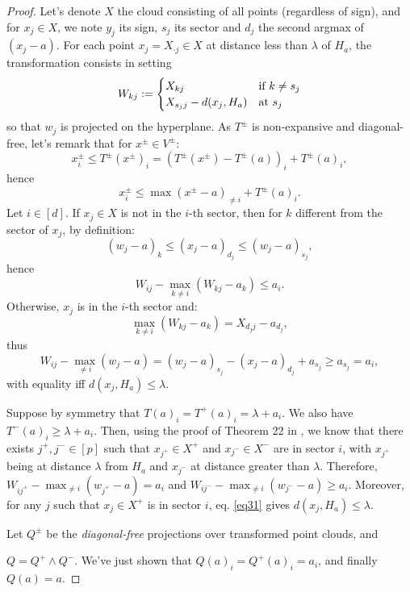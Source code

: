 \documentclass[oneside,english]{amsart}
\numberwithin{equation}{section}
\numberwithin{figure}{section}
\theoremstyle{plain}
\theoremstyle{definition}
\theoremstyle{plain}
\theoremstyle{remark}
\theoremstyle{plain}
\theoremstyle{definition}
\theoremstyle{definition}
\begin{document}
\begin{proof}
Let's denote $X$ the cloud consisting of all points (regardless of
sign), and for $x_{j}\in X$, we note $y_{j}$ its sign, $s_{j}$
its sector and $d_{j}$ the second argmax of $(x_{j}-a)$. For each
point $x_{j}=X_{\cdot j}\in X$ at distance less than $\lambda$ of
$H_{a}$, the transformation consists in setting
\[
W_{kj}:=\begin{cases}
X_{kj} & \text{if \ensuremath{k\ne s_{j}}}\\
X_{s_{j}j}-d(x_{j},H_{a}) & \text{at \ensuremath{s_{j}}}
\end{cases}
\]
so that $w_{j}$ is projected on the hyperplane. As $T^{\pm}$ is
non-expansive and diagonal-free, let's remark that for $x^{\pm}\in V^{\pm}$:
\[
x_{i}^{\pm}\le T^{\pm}(x^{\pm})_{i}=\left(T^{\pm}(x^{\pm})-T^{\pm}(a)\right)_{i}+T^{\pm}(a)_{i},
\]
hence 
\begin{equation}
x_{i}^{\pm}\le\max(x^{\pm}-a)_{\ne i}+T^{\pm}(a)_{i}.\label{eq31}
\end{equation}
Let $i\in[d]$. If $x_{j}\in X$ is not in the $i$-th sector, then
for $k$ different from the sector of $x_{j}$, by definition:
\[
(w_{j}-a)_{k}\le(x_{j}-a)_{d_{j}}\le(w_{j}-a)_{s_{j}},
\]
hence
\[
W_{ij}-\max_{k\ne i}\left(W_{kj}-a_{k}\right)\le a_{i}.
\]
Otherwise, $x_{j}$ is in the $i$-th sector and:
\[
\max_{k\ne i}\left(W_{kj}-a_{k}\right)=X_{d_{j}j}-a_{d_{j}},
\]
thus
\[
W_{ij}-\max_{\ne i}\left(w_{j}-a\right)=\left(w_{j}-a\right)_{s_{j}}-\left(x_{j}-a\right)_{d_{j}}+a_{s_{j}}\ge a_{s_{j}}=a_{i},
\]
with equality iff $d(x_{j},H_{a})\leq\lambda$.

Suppose by symmetry that $T(a)_{i}=T^{+}(a)_{i}=\lambda+a_{i}.$ We
also have $T^{-}(a)_{i}\ge\lambda+a_{i}$. Then, using the proof of
Theorem 22 in \cite{Akian2021TropicalLR}, we know that there exists
$j^{+},j^{-}\in[p]$ such that $x_{j^{+}}\in X^+$ and $x_{j^{-}}\in X^-$ are in sector $i$,
with $x_{j^{+}}$ being at distance $\lambda$ from $H_{a}$ and $x_{j^{-}}$
at distance greater than $\lambda$. Therefore, $W_{ij^+}-\max_{\ne i}\left(w_{j^+}-a\right)=a_{i}$
and $W_{ij^-}-\max_{\ne i}\left(w_{j^-}-a\right)\geq a_{i}$. Moreover, for any $j$ such that $x_{j}\in X^+$ is in sector
$i$, eq. \ref{eq31} gives $d(x_{j},H_{a})\leq\lambda$.

Let $Q^{\pm}$ be the \emph{diagonal-free} projections over transformed
point clouds, and 

$Q=Q^{+}\wedge Q^{-}.$ We've just shown that 
$Q(a)_{i}=Q^{+}(a)_{i}=a_{i}$,
and finally $Q(a)=a$.


\end{proof}
\end{document}
